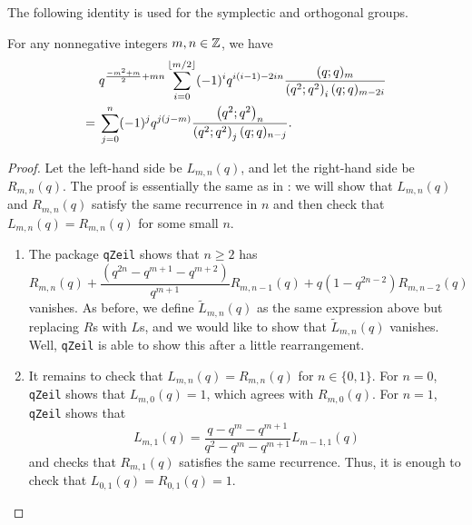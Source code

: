 The following identity is used for the symplectic and orthogonal groups.
\begin{prop} \label{prop:sp-q-identity}
    For any nonnegative integers $m,n\in\mathbb Z$, we have
    \begin{align*}
        & q^{\frac{-m^2+m}2+mn}\sum_{i=0}^{\left\lfloor{m/2}\right\rfloor}(-1)^iq^{i(i-1)-2in}\frac{(q;q)_m}{\left(q^2;q^2\right)_i(q;q)_{m-2i}} \\
        ={}& \sum_{j=0}^n(-1)^jq^{j(j-m)}\frac{\left(q^2;q^2\right)_{n}}{\left(q^2;q^2\right)_j(q;q)_{n-j}}.
    \end{align*}
\end{prop}
\begin{proof}
    Let the left-hand side be $L_{m,n}(q)$, and let the right-hand side be $R_{m,n}(q)$. The proof is essentially the same as in : we will show that $L_{m,n}(q)$ and $R_{m,n}(q)$ satisfy the same recurrence in $n$ and then check that $L_{m,n}(q)=R_{m,n}(q)$ for some small $n$.
    \begin{enumerate}
        \item The package \texttt{qZeil} shows that $n\ge2$ has
        \[R_{m,n}\left(q\right)+\frac{\left(q^{2n}-q^{m+1}-q^{m+2}\right)}{q^{m+1}}R_{m,n-1}\left(q\right)+q\left(1-q^{2n-2}\right)R_{m,n-2}\left(q\right)\]
        vanishes. As before, we define $\widetilde L_{m,n}(q)$ as the same expression above but replacing $R$s with $L$s, and we would like to show that $\widetilde L_{m,n}(q)$ vanishes. Well, \texttt{qZeil} is able to show this after a little rearrangement.
        \item It remains to check that $L_{m,n}(q)=R_{m,n}(q)$ for $n\in\{0,1\}$. For $n=0$, \texttt{qZeil} shows that $L_{m,0}(q)=1$, which agrees with $R_{m,0}(q)$. For $n=1$, \texttt{qZeil} shows that
        \[L_{m,1}(q)=\frac{q-q^m-q^{m+1}}{q^2-q^m-q^{m+1}}L_{m-1,1}(q)\]
        and checks that $R_{m,1}(q)$ satisfies the same recurrence. Thus, it is enough to check that $L_{0,1}(q)=R_{0,1}(q)=1$.
        \qedhere
    \end{enumerate}
\end{proof}

